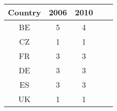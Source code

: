 \centering
\begin{tabular}{ccccc}
\toprule
Country & 2006 & 2010 \\
\midrule
BE      & 5    & 4    \\
CZ      & 1    & 1    \\
FR      & 3    & 3    \\
DE      & 3    & 3    \\
ES      & 3    & 3    \\
UK      & 1    & 1    \\
\bottomrule
\end{tabular}%
%

